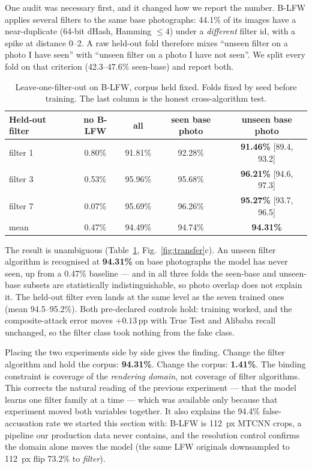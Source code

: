 \documentclass[conference]{IEEEtran}
\newcommand{\win}[1]{\textbf{#1}}
\begin{document}
One audit was necessary first, and it changed how we report the number. B-LFW applies several
filters to the same base photographs: 44.1\% of its images have a near-duplicate (64-bit dHash,
Hamming $\le 4$) under a \emph{different} filter id, with a spike at distance 0--2. A raw
held-out fold therefore mixes ``unseen filter on a photo I have seen'' with ``unseen filter on
a photo I have not seen''. We split every fold on that criterion (42.3--47.6\% seen-base) and
report both.

\begin{table}[t]
\caption{Leave-one-filter-out on B-LFW, corpus held fixed. Folds fixed by seed before
training. The last column is the honest cross-algorithm test.}
\label{tab:lofo}
\centering\scriptsize
\begin{tabular}{@{}lcccc@{}}
\toprule
Held-out filter & no B-LFW & all & seen base photo & \textbf{unseen base photo} \\
\midrule
filter 1 & 0.80\% & 91.81\% & 92.28\% & \win{91.46\%} [89.4, 93.2] \\
filter 3 & 0.53\% & 95.96\% & 95.68\% & \win{96.21\%} [94.6, 97.3] \\
filter 7 & 0.07\% & 95.69\% & 96.26\% & \win{95.27\%} [93.7, 96.5] \\
\midrule
mean     & 0.47\% & 94.49\% & 94.74\% & \win{94.31\%} \\
\bottomrule
\end{tabular}
\end{table}

The result is unambiguous (Table~\ref{tab:lofo}, Fig.~\ref{fig:transfer}c). An unseen filter
algorithm is recognised at \textbf{94.31\%} on base photographs the model has never seen, up
from a 0.47\% baseline --- and in all three folds the seen-base and unseen-base subsets are
statistically indistinguishable, so photo overlap does not explain it. The held-out filter even
lands at the same level as the seven trained ones (mean 94.5--95.2\%). Both pre-declared
controls hold: training worked, and the composite-attack error moves $+0.13$\,pp with True
Test and Alibaba recall unchanged, so the filter class took nothing from the fake class.

Placing the two experiments side by side gives the finding. Change the filter algorithm and
hold the corpus: \textbf{94.31\%}. Change the corpus: \textbf{1.41\%}. The binding constraint
is coverage of the \emph{rendering domain}, not coverage of filter algorithms. This corrects
the natural reading of the previous experiment --- that the model learns one filter family at a
time --- which was available only because that experiment moved both variables together. It
also explains the 94.4\% false-accusation rate we started this section with: B-LFW is
\SI{112}{px} MTCNN crops, a pipeline our production data never contains, and the resolution
control confirms the domain alone moves the model (the same LFW originals downsampled to
\SI{112}{px} flip 73.2\% to \emph{filter}).
\end{document}

